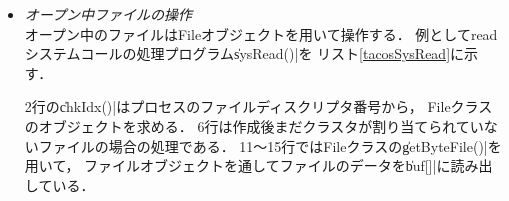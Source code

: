 \begin{itemize}
  2行はクライアントプロセスのPCB中に
  ファイルを記録を残す場所を確保している\footnote{
    プロセス終了時にファイルを自動的にクローズるために，
    プロセス（PCB）に記録を残す必要がある．}．
  4行はfatSysクラスの\|files|配列に場所を確保している．
  7行で\|path|を最後まで解析し目的ファイルのディレクトリエントリを探す．
  見つからない場合はエラーになる\footnote{
    TacOSのopenシステムコールにはファイルの作成機能は無い．
    ファイルの作成はcreatシステムコールで行う．}．
  12行でディレクトリファイルも読み出しオープンを可能にしている．
  14〜18行ではFileオブジェクトとセクタを格納するバッファを生成している．

  

  20〜29行ではFileオブジェクトを初期化している．
  21行ではオープンファイルが
  ディレクトリファイルであることを表すブラグをセットしている．
  26〜27行ではオープンファイルが格納されている
  ディレクトリエントリを記録している\footnote{
    FATファイルシステムでは
    ファイルサイズなどをディレクトリエントリに記録しているので，
    ファイルをオープン後もディレクトリエントリにアクセスする必要がある．}．
  
  33行，35行では，Fileオブジェクトを引数にfileクラスの関数を使用してる．
  \cmm 言語で，
  fileクラスのような複数のインスタンスを持つクラスを操作する場合，
  インスタンスを引数にクラスの関数を呼び出す．

  

\item \emph{オープン中ファイルの操作} \\
  オープン中のファイルはFileオブジェクトを用いて操作する．
  例としてreadシステムコールの処理プログラム\|sysRead()|を
  リスト\ref{tacosSysRead}に示す．

  

  2行の\|chkIdx()|はプロセスのファイルディスクリプタ番号から，
  Fileクラスのオブジェクトを求める．
  6行は作成後まだクラスタが割り当てられていないファイルの場合の処理である．
  11〜15行ではFileクラスの\|getByteFile()|を用いて，
  ファイルオブジェクトを通してファイルのデータを\|buf[]|に読み出している．


\end{itemize}
